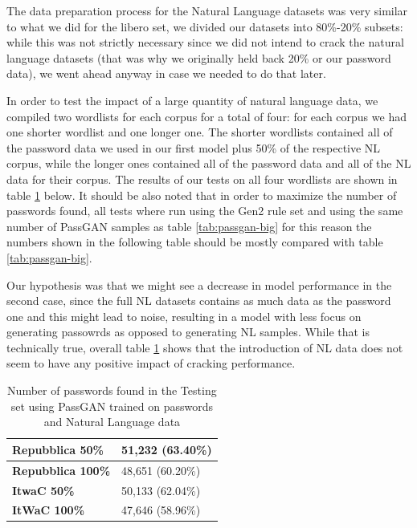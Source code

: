The data preparation process for the Natural Language datasets was very similar to what we did for the libero set, we divided our datasets into 80\%-20\% subsets: while this was not strictly necessary since we did not intend to crack the natural language datasets (that was why we originally held back 20\% or our password data), we went ahead anyway in case we needed to do that later. 

In order to test the impact of a large quantity of natural language data, we compiled two wordlists for each corpus for a total of four: for each corpus we had one shorter wordlist and one longer one.
The shorter wordlists contained all of the password data we used in our first model plus 50\% of the respective NL corpus, while the longer ones contained all of the password data and all of the NL data for their corpus.
The results of our tests on all four wordlists are shown in table \ref{tab:nl-results} below. It should be also noted that in order to maximize the number of passwords found, all tests where run using the Gen2 rule set and using the same number of PassGAN samples as table \ref{tab:passgan-big} for this reason the numbers shown in the following table should be mostly compared with table \ref{tab:passgan-big}.

Our hypothesis was that we might see a decrease in model performance in the second case, since the full NL datasets contains as much data as the password one and this might lead to noise, resulting in a model with less focus on generating passowrds as opposed to generating NL samples. While that is technically true, overall table \ref{tab:nl-results} shows that the introduction of NL data does not seem to have any positive impact of cracking performance.

\begin{table}[H]
\centering
\begin{tabular}{|l|l|}
\hline
\textbf{Repubblica 50\%} & 51,232 (63.40\%) \\ \hline
\textbf{Repubblica 100\%} & 48,651 (60.20\%)  \\ \hline
\textbf{ItwaC 50\%} & 50,133 (62.04\%)  \\ \hline
\textbf{ItWaC 100\%} & 47,646 (58.96\%)  \\ \hline
\end{tabular}
\caption{Number of passwords found in the Testing set using PassGAN trained on passwords and Natural Language data}
\label{tab:nl-results}
\end{table}


